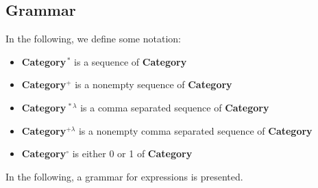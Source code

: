 \documentclass[a4,14pt,latin1]{article}
\begin{document}
\subsection{Grammar}
In the following, we define some notation:
\begin{itemize}
\item {\bf Category}$^{\displaystyle \,*}$ is a sequence of {\bf Category}
\item {\bf Category}$^{\displaystyle +}$ is a nonempty sequence of
                                                            {\bf Category}
\item {\bf Category}$^{\displaystyle \,*\lambda}$ is a comma separated sequence
                                                         of {\bf Category}
\item {\bf Category}$^{\displaystyle +\lambda}$ is a nonempty comma separated
                                                sequence of {\bf Category}
\item {\bf Category}$^{\displaystyle \circ}$ is either 0 or 1 of
                                                            {\bf Category}
\end{itemize}
In the following, a grammar for \RAS{} expressions is presented.
\end{document}
